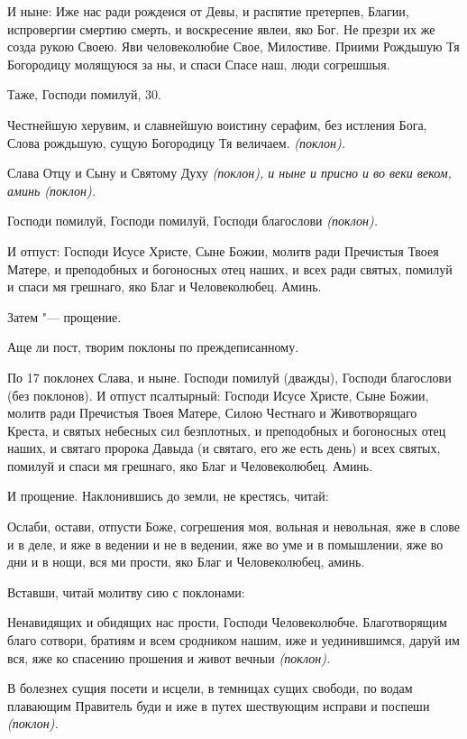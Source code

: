 И ныне: Иже нас ради рождеися от Девы, и распятие претерпев, Благии, испровергии смертию смерть, и воскресение явлеи, яко Бог. Не презри их же созда рукою Своею. Яви человеколюбие Свое, Милостиве. Приими Рождьшую Тя Богородицу молящуюся за ны, и спаси Спасе наш, люди согрешшыя.


Таже, Господи помилуй, 30.


Честнейшую херувим, и славнейшую воистину серафим, без истления Бога, Слова рождьшую, сущую Богородицу Тя величаем. \itshape (поклон)\normalfont{}.


Слава Отцу и Сыну и Святому Духу \itshape (поклон)\normalfont{}, и ныне и присно и во веки веком, аминь \itshape (поклон)\normalfont{}.


Господи помилуй, Господи помилуй, Господи благослови \itshape (поклон)\normalfont{}.


И отпуст: Господи Исусе Христе, Сыне Божии, молитв ради Пречистыя Твоея Матере, и преподобных и богоносных отец наших, и всех ради святых, помилуй и спаси мя грешнаго, яко Благ и Человеколюбец. Аминь.


Затем "--- прощение.


Аще ли пост, творим поклоны по преждеписанному.


По 17 поклонех Слава, и ныне. Господи помилуй (дважды), Господи благослови (без поклонов). И отпуст псалтырный: Господи Исусе Христе, Сыне Божии, молитв ради Пречистыя Твоея Матере, Силою Честнаго и Животворящаго Креста, и святых небесных сил безплотных, и преподобных и богоносных отец наших, и святаго пророка Давыда (и святаго, его же есть день) и всех святых, помилуй и спаси мя грешнаго, яко Благ и Человеколюбец. Аминь.


И прощение. Наклонившись до земли, не крестясь, читай:


Ослаби, остави, отпусти Боже, согрешения моя, вольная и невольная, яже в слове и в деле, и яже в ведении и не в ведении, яже во уме и в помышлении, яже во дни и в нощи, вся ми прости, яко Благ и Человеколюбец, аминь.


Вставши, читай молитву сию с поклонами:


Ненавидящих и обидящих нас прости, Господи Человеколюбче. Благотворящим благо сотвори, братиям и всем сродником нашим, иже и уединившимся, даруй им вся, яже ко спасению прошения и живот вечныи \itshape (поклон)\normalfont{}.


В болезнех сущия посети и исцели, в темницах сущих свободи, по водам плавающим Правитель буди и иже в путех шествующим исправи и поспеши \itshape (поклон)\normalfont{}.


